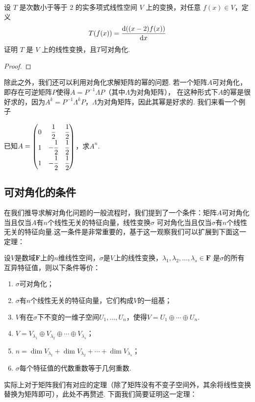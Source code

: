 \begin{example}
    设 $T$ 是次数小于等于 $2$ 的实多项式线性空间 $V$ 上的变换，对任意 $f(x) \in V$，定义
    \[T(f(x))=\frac{\textup{d}((x-2)f(x))}{\textup{d}x}\]
    证明 $T$ 是 $V$ 上的线性变换，且$T$可对角化.
\end{example}
\begin{proof}
    
\end{proof}

除此之外，我们还可以利用对角化求解矩阵的幂的问题.
若一个矩阵$A$可对角化，即存在可逆矩阵$P$使得$A=P^{-1}\Lambda P$（其中$\Lambda$为对角矩阵），
在这种形式下$A$的幂是很好求的，因为$A^k=P^{-1}\Lambda^kP$，$\Lambda$为对角矩阵，因此其幂是好求的.
我们来看一个例子
\begin{example}
    已知$A=\begin{pmatrix}
        0 & \cfrac{1}{2} & \cfrac{1}{2} \\ 1 & -\cfrac{1}{2} & \cfrac{1}{2} \\ 1 & -\cfrac{1}{2} & \cfrac{1}{2}
    \end{pmatrix}$，求$A^n$.
\end{example}
\begin{solution}

\end{solution}

\subsection{可对角化的条件}
在我们推导求解对角化问题的一般流程时，我们提到了一个条件：矩阵$A$可对角化当且仅当$A$有$n$个线性无关的特征向量，线性变换$\sigma$
可对角化当且仅当$\sigma$有$n$个线性无关的特征向量.这一条件是非常重要的，基于这一观察我们可以扩展到下面这一定理：
\begin{theorem}
    设$V$是数域$\mathbf{F}$上的$n$维线性空间，$\sigma$是$V$上的线性变换，$\lambda_1,\lambda_2,\ldots,\lambda_s\in\mathbf{F}$
    是$\sigma$的所有互异特征值，则以下条件等价：
    \begin{enumerate}[label=(\arabic*)]
        \item $\sigma$可对角化；
        \item $\sigma$有$n$个线性无关的特征向量，它们构成$V$的一组基；
        \item $V$有在$\sigma$下不变的一维子空间$U_1,\ldots,U_n$，使得$V=U_1\oplus\cdots\oplus U_n$.
        \item $V=V_{\lambda_1}\oplus V_{\lambda_2}\oplus\cdots\oplus V_{\lambda_s}$；
        \item $n=\dim V_{\lambda_1}+\dim V_{\lambda_2}+\cdots+\dim V_{\lambda_s}$；
        \item $\sigma$每个特征值的代数重数等于几何重数.
    \end{enumerate}
\end{theorem}
实际上对于矩阵我们有对应的定理（除了矩阵没有不变子空间外，其余将线性变换替换为矩阵即可），此处不再赘述.
下面我们简要证明这一定理：

